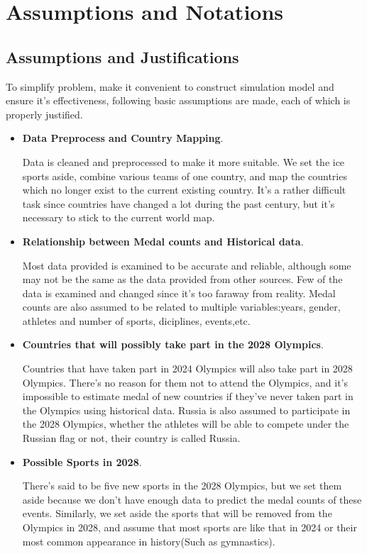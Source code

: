 
\section{Assumptions and Notations}

\subsection{Assumptions and Justifications}

To simplify problem, make it convenient to construct simulation model and ensure it's effectiveness, following basic assumptions are made, each of which is properly justified.

\begin{itemize}
\item {\bf Data Preprocess and Country Mapping}. 

Data is cleaned and preprocessed to make it more suitable. We set the ice sports aside, combine various teams of one country, and map the countries which no longer exist to the current existing country. It's a rather difficult task since countries have changed a lot during the past century, but it's necessary to stick to the current world map.

\item {\bf Relationship between Medal counts and Historical data}. 

Most data provided is examined to be accurate and reliable, although some may not be the same as the data provided from other sources. Few of the data is examined and changed since it's too faraway from reality. Medal counts are also assumed to be related to multiple variables:years, gender, athletes and number of sports, diciplines, events,etc.

\item {\bf Countries that will possibly take part in the 2028 Olympics}. 

Countries that have taken part in 2024 Olympics will also take part in 2028 Olympics. There's no reason for them not to attend the Olympics, and it's impossible to estimate medal of new countries if they've never taken part in the Olympics using historical data. Russia is also assumed to participate in the 2028 Olympics, whether the athletes will be able to compete under the Russian flag or not, their country is called Russia. 

\item {\bf Possible Sports in 2028}. 

There's said to be five new sports in the 2028 Olympics, but we set them aside because we don't have enough data to predict the medal counts of these events. Similarly, we set aside the sports that will be removed from the Olympics in 2028, and assume that most sports are like that in 2024 or their most common appearance in history(Such as gymnastics).


\end{itemize}

